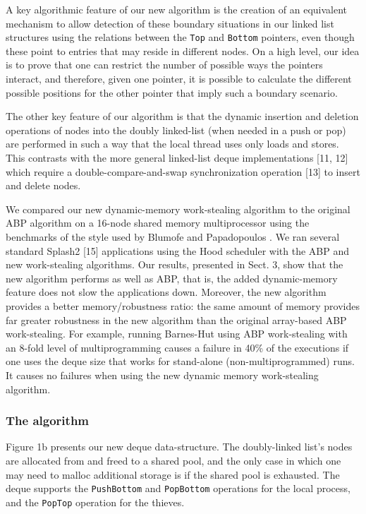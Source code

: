 A key algorithmic feature of our new algorithm is the creation of an
equivalent mechanism to allow detection of these boundary situations
in our linked list structures using the relations between the
\lstinline!Top! and \lstinline!Bottom! pointers, even though these
point to entries that may reside in different nodes. On a high level,
our idea is to prove that one can restrict the number of possible ways
the pointers interact, and therefore, given one pointer, it is
possible to calculate the different possible positions for the other
pointer that imply such a boundary scenario.

The other key feature of our algorithm is that the dynamic insertion
and deletion operations of nodes into the doubly linked-list (when
needed in a push or pop) are performed in such a way that the local
thread uses only loads and stores. This contrasts with the more
general linked-list deque implementations [11, 12] which require a
double-compare-and-swap synchronization operation [13] to insert and
delete nodes.


We compared our new dynamic-memory work-stealing algorithm to the
original ABP algorithm on a 16-node shared memory multiprocessor using
the benchmarks of the style used by Blumofe and Papadopoulos
\cite{Blumofe1998a}. We ran several standard Splash2 [15] applications
using the Hood scheduler \cite{Papadopoulos1998} with the ABP and new
work-stealing algorithms. Our results, presented in Sect. 3, show that
the new algorithm performs as well as ABP, that is, the added
dynamic-memory feature does not slow the applications down. Moreover,
the new algorithm provides a better memory/robustness ratio: the same
amount of memory provides far greater robustness in the new algorithm
than the original array-based ABP work-stealing. For example, running
Barnes-Hut using ABP work-stealing with an 8-fold level of
multiprogramming causes a failure in 40\% of the executions if one
uses the deque size that works for stand-alone (non-multiprogrammed)
runs. It causes no failures when using the new dynamic memory
work-stealing algorithm.

\subsubsection{The algorithm}


Figure 1b presents our new deque data-structure. The doubly-linked
list's nodes are allocated from and freed to a shared pool, and the
only case in which one may need to malloc additional storage is if the
shared pool is exhausted. The deque supports the
\lstinline!PushBottom! and \lstinline!PopBottom! operations for the
local process, and the \lstinline!PopTop! operation for the thieves.

